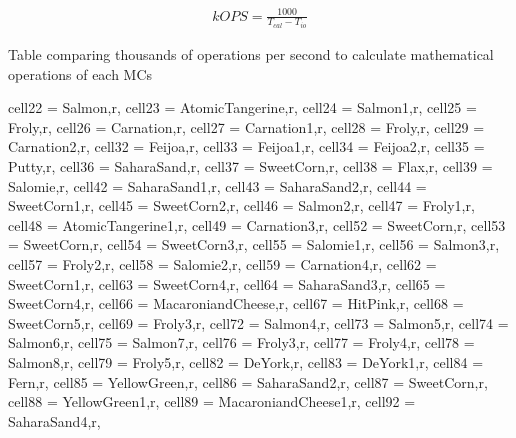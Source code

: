 \begin{ceqn}
	\begin{align} \label{kops}
		kOPS= \frac{1000}{T_{cal} - T_{io}}
	\end{align}
\end{ceqn}


\begin{table}[H]
	\centering
	\caption{Table comparing thousands of operations per second to calculate mathematical operations of each MCs}\label{TestTimeT2}

	\begin{adjustbox}{width=\textwidth}

		\begin{tblr}{
				cell{2}{2} = {Salmon,r},
				cell{2}{3} = {AtomicTangerine,r},
				cell{2}{4} = {Salmon1,r},
				cell{2}{5} = {Froly,r},
				cell{2}{6} = {Carnation,r},
				cell{2}{7} = {Carnation1,r},
				cell{2}{8} = {Froly,r},
				cell{2}{9} = {Carnation2,r},
				cell{3}{2} = {Feijoa,r},
				cell{3}{3} = {Feijoa1,r},
				cell{3}{4} = {Feijoa2,r},
				cell{3}{5} = {Putty,r},
				cell{3}{6} = {SaharaSand,r},
				cell{3}{7} = {SweetCorn,r},
				cell{3}{8} = {Flax,r},
				cell{3}{9} = {Salomie,r},
				cell{4}{2} = {SaharaSand1,r},
				cell{4}{3} = {SaharaSand2,r},
				cell{4}{4} = {SweetCorn1,r},
				cell{4}{5} = {SweetCorn2,r},
				cell{4}{6} = {Salmon2,r},
				cell{4}{7} = {Froly1,r},
				cell{4}{8} = {AtomicTangerine1,r},
				cell{4}{9} = {Carnation3,r},
				cell{5}{2} = {SweetCorn,r},
				cell{5}{3} = {SweetCorn,r},
				cell{5}{4} = {SweetCorn3,r},
				cell{5}{5} = {Salomie1,r},
				cell{5}{6} = {Salmon3,r},
				cell{5}{7} = {Froly2,r},
				cell{5}{8} = {Salomie2,r},
				cell{5}{9} = {Carnation4,r},
				cell{6}{2} = {SweetCorn1,r},
				cell{6}{3} = {SweetCorn4,r},
				cell{6}{4} = {SaharaSand3,r},
				cell{6}{5} = {SweetCorn4,r},
				cell{6}{6} = {MacaroniandCheese,r},
				cell{6}{7} = {HitPink,r},
				cell{6}{8} = {SweetCorn5,r},
				cell{6}{9} = {Froly3,r},
				cell{7}{2} = {Salmon4,r},
				cell{7}{3} = {Salmon5,r},
				cell{7}{4} = {Salmon6,r},
				cell{7}{5} = {Salmon7,r},
				cell{7}{6} = {Froly3,r},
				cell{7}{7} = {Froly4,r},
				cell{7}{8} = {Salmon8,r},
				cell{7}{9} = {Froly5,r},
				cell{8}{2} = {DeYork,r},
				cell{8}{3} = {DeYork1,r},
				cell{8}{4} = {Fern,r},
				cell{8}{5} = {YellowGreen,r},
				cell{8}{6} = {SaharaSand2,r},
				cell{8}{7} = {SweetCorn,r},
				cell{8}{8} = {YellowGreen1,r},
				cell{8}{9} = {MacaroniandCheese1,r},
				cell{9}{2} = {SaharaSand4,r},
}
\end{tblr}
\end{adjustbox}
\end{table}
